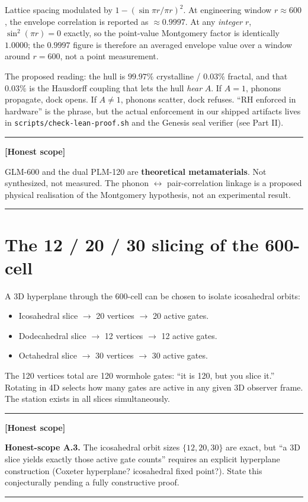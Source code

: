 \documentclass[11pt,letterpaper]{article}
\newenvironment{honest}%
  {\par\medskip\noindent\rule{\linewidth}{0.5pt}\par\nopagebreak\textbf{[Honest scope]}\par\nopagebreak\small}%
  {\par\nopagebreak\normalsize\rule{\linewidth}{0.5pt}\par\medskip}
\begin{document}
Lattice spacing modulated by $1 - (\sin \pi r / \pi r)^2$. At engineering
window $r \approx 600$, the envelope correlation is reported as
$\approx 0.9997$. At any \emph{integer} $r$, $\sin^2(\pi r) = 0$ exactly,
so the point-value Montgomery factor is identically $1.0000$; the
$0.9997$ figure is therefore an averaged envelope value over a window
around $r = 600$, not a point measurement.

The proposed reading: the hull is $99.97\%$ crystalline / $0.03\%$ fractal,
and that $0.03\%$ is the Hausdorff coupling that lets the hull
\emph{hear} $A$. If $A = 1$, phonons propagate, dock opens. If $A \neq 1$,
phonons scatter, dock refuses. ``RH enforced in hardware'' is the
phrase, but the actual enforcement in our shipped artifacts lives in
\texttt{scripts/check-lean-proof.sh} and the Genesis seal verifier
(see Part II).

\begin{honest}
GLM-600 and the dual PLM-120 are \textbf{theoretical metamaterials}. Not
synthesized, not measured. The phonon $\leftrightarrow$ pair-correlation
linkage is a proposed physical realisation of the Montgomery hypothesis,
not an experimental result.
\end{honest}

\section{The 12 / 20 / 30 slicing of the 600-cell}
\label{sec:slicing}

A 3D hyperplane through the 600-cell can be chosen to isolate icosahedral
orbits:
\begin{itemize}
  \item Icosahedral slice $\rightarrow$ 20 vertices $\rightarrow$ 20 active gates.
  \item Dodecahedral slice $\rightarrow$ 12 vertices $\rightarrow$ 12 active gates.
  \item Octahedral slice $\rightarrow$ 30 vertices $\rightarrow$ 30 active gates.
\end{itemize}
The 120 vertices total are 120 wormhole gates: ``it is 120, but you slice it.''
Rotating in 4D selects how many gates are active in any given 3D observer
frame. The station exists in all slices simultaneously.

\begin{honest}
\textbf{Honest-scope A.3.} The icosahedral orbit sizes $\{12, 20, 30\}$ are
exact, but ``a 3D slice yields exactly those active gate counts'' requires
an explicit hyperplane construction (Coxeter hyperplane? icosahedral fixed
point?). State this conjecturally pending a fully constructive proof.
\end{honest}
\end{document}
